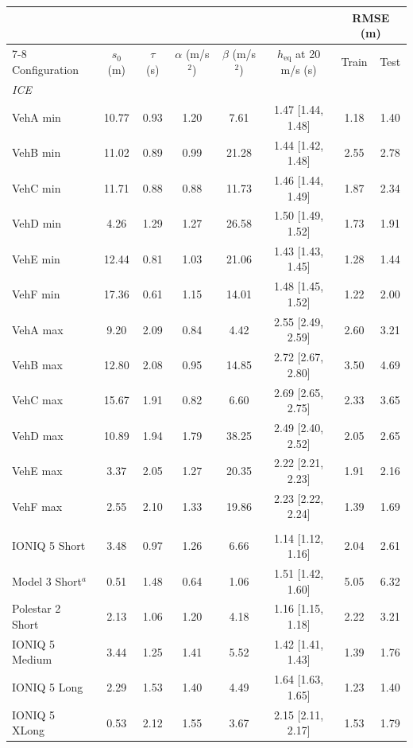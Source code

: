 \begin{tabular}{lccccccc}
\toprule
 & & & & & & \multicolumn{2}{c}{RMSE (m)} \\
\cmidrule(lr){7-8}
Configuration & $s_0$ (m) & $\tau$ (s) & $\alpha$ (m/s$^2$) & $\beta$ (m/s$^2$) & $h_{\mathrm{eq}}$ at 20 m/s (s) & Train & Test \\
\midrule
\multicolumn{8}{l}{\textit{ICE}} \\
\quad VehA min & 10.77 & 0.93 & 1.20 & 7.61 & 1.47 [1.44, 1.48] & 1.18 & 1.40 \\
\quad VehB min & 11.02 & 0.89 & 0.99 & 21.28 & 1.44 [1.42, 1.48] & 2.55 & 2.78 \\
\quad VehC min & 11.71 & 0.88 & 0.88 & 11.73 & 1.46 [1.44, 1.49] & 1.87 & 2.34 \\
\quad VehD min & 4.26 & 1.29 & 1.27 & 26.58 & 1.50 [1.49, 1.52] & 1.73 & 1.91 \\
\quad VehE min & 12.44 & 0.81 & 1.03 & 21.06 & 1.43 [1.43, 1.45] & 1.28 & 1.44 \\
\quad VehF min & 17.36 & 0.61 & 1.15 & 14.01 & 1.48 [1.45, 1.52] & 1.22 & 2.00 \\
\quad VehA max & 9.20 & 2.09 & 0.84 & 4.42 & 2.55 [2.49, 2.59] & 2.60 & 3.21 \\
\quad VehB max & 12.80 & 2.08 & 0.95 & 14.85 & 2.72 [2.67, 2.80] & 3.50 & 4.69 \\
\quad VehC max & 15.67 & 1.91 & 0.82 & 6.60 & 2.69 [2.65, 2.75] & 2.33 & 3.65 \\
\quad VehD max & 10.89 & 1.94 & 1.79 & 38.25 & 2.49 [2.40, 2.52] & 2.05 & 2.65 \\
\quad VehE max & 3.37 & 2.05 & 1.27 & 20.35 & 2.22 [2.21, 2.23] & 1.91 & 2.16 \\
\quad VehF max & 2.55 & 2.10 & 1.33 & 19.86 & 2.23 [2.22, 2.24] & 1.39 & 1.69 \\
\addlinespace
\multicolumn{8}{l}{\textit{EV}} \\
\quad IONIQ 5 Short & 3.48 & 0.97 & 1.26 & 6.66 & 1.14 [1.12, 1.16] & 2.04 & 2.61 \\
\quad Model 3 Short$^{a}$ & 0.51 & 1.48 & 0.64 & 1.06 & 1.51 [1.42, 1.60] & 5.05 & 6.32 \\
\quad Polestar 2 Short & 2.13 & 1.06 & 1.20 & 4.18 & 1.16 [1.15, 1.18] & 2.22 & 3.21 \\
\quad IONIQ 5 Medium & 3.44 & 1.25 & 1.41 & 5.52 & 1.42 [1.41, 1.43] & 1.39 & 1.76 \\
\quad IONIQ 5 Long & 2.29 & 1.53 & 1.40 & 4.49 & 1.64 [1.63, 1.65] & 1.23 & 1.40 \\
\quad IONIQ 5 XLong & 0.53 & 2.12 & 1.55 & 3.67 & 2.15 [2.11, 2.17] & 1.53 & 1.79 \\
\bottomrule
\end{tabular}
